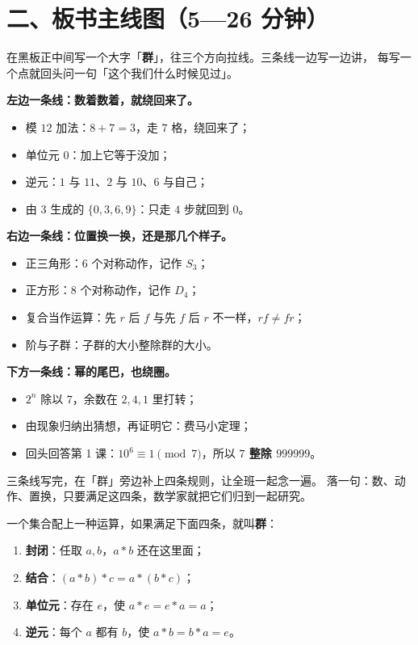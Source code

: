 \section*{二、板书主线图（5—26 分钟）}

\begin{caozuo}
  在黑板正中间写一个大字「\textbf{群}」，往三个方向拉线。三条线一边写一边讲，
  每写一个点就回头问一句「这个我们什么时候见过」。
\end{caozuo}

\textbf{左边一条线：数着数着，就绕回来了。}

\begin{itemize}
  \item 模 \(12\) 加法：\(8+7=3\)，走 \(7\) 格，绕回来了；
  \item 单位元 \(0\)：加上它等于没加；
  \item 逆元：\(1\) 与 \(11\)、\(2\) 与 \(10\)、\(6\) 与自己；
  \item 由 \(3\) 生成的 \(\{0,3,6,9\}\)：只走 \(4\) 步就回到 \(0\)。
\end{itemize}

\textbf{右边一条线：位置换一换，还是那几个样子。}

\begin{itemize}
  \item 正三角形：\(6\) 个对称动作，记作 \(S_3\)；
  \item 正方形：\(8\) 个对称动作，记作 \(D_4\)；
  \item 复合当作运算：先 \(r\) 后 \(f\) 与先 \(f\) 后 \(r\) 不一样，\(rf\neq fr\)；
  \item 阶与子群：子群的大小整除群的大小。
\end{itemize}

\textbf{下方一条线：幂的尾巴，也绕圈。}

\begin{itemize}
  \item \(2^n\) 除以 \(7\)，余数在 \(2,4,1\) 里打转；
  \item 由现象归纳出猜想，再证明它：费马小定理；
  \item 回头回答第 1 课：\(10^{6}\equiv1\pmod 7\)，所以 \textbf{\(7\) 整除 \(999999\)}。
\end{itemize}

\begin{caozuo}
  三条线写完，在「群」旁边补上四条规则，让全班一起念一遍。
  落一句：数、动作、置换，只要满足这四条，数学家就把它们归到一起研究。
\end{caozuo}

\begin{definition}[群]
  一个集合配上一种运算，如果满足下面四条，就叫\textbf{群}：
  \begin{enumerate}
    \item \textbf{封闭}：任取 \(a,b\)，\(a*b\) 还在这里面；
    \item \textbf{结合}：\((a*b)*c=a*(b*c)\)；
    \item \textbf{单位元}：存在 \(e\)，使 \(a*e=e*a=a\)；
    \item \textbf{逆元}：每个 \(a\) 都有 \(b\)，使 \(a*b=b*a=e\)。
  \end{enumerate}
\end{definition}

